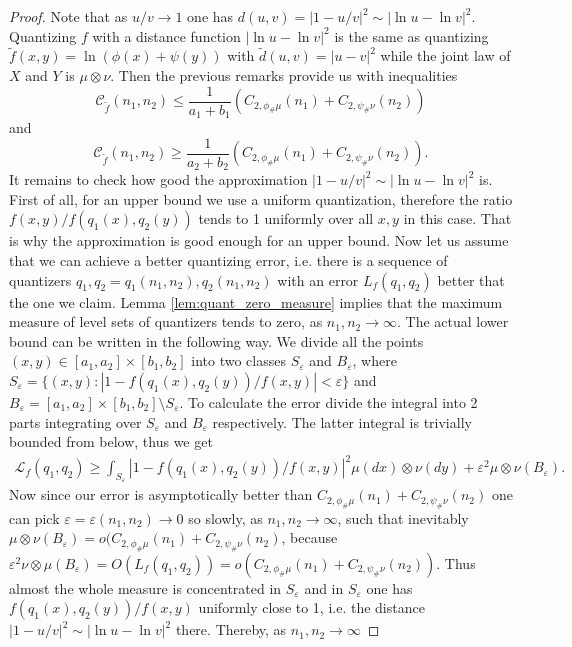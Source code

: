 \documentclass{amsart}
\theoremstyle{remark}
\numberwithin{equation}{section}
\numberwithin{figure}{section}
\def\eps{\varepsilon}
\begin{document}
\begin{proof}
	Note that as $u/v \to 1$ one has $d(u, v) = |1-u/v|^2 \sim |\ln u - \ln v|^2$. Quantizing $f$ with a distance function $|\ln u -\ln v|^2$ is the same as quantizing $\tilde f(x, y) = \ln(\phi(x) + \psi(y))$ with $\tilde d(u, v) = |u-v|^2$ while the joint law of $X$ and $Y$ is $\mu \otimes \nu$. Then the previous remarks provide us with inequalities
	\[
	\mathcal{C}_{\tilde f}(n_1, n_2) \leq \frac{1}{a_1 + b_1} (C_{2,\phi_\#\mu}(n_1) + C_{2,\psi_\#\nu}(n_2))
	\]
	and
	\[
	\mathcal{C}_{\tilde f}(n_1, n_2) \geq \frac{1}{a_2 + b_2} (C_{2,\phi_\#\mu}(n_1) + C_{2,\psi_\#\nu}(n_2)).
	\]
	It remains to check how good the approximation $|1 - u/v|^2 \sim |\ln u - \ln v|^2$ is. 
	First of all, for an upper bound we use a uniform quantization, therefore the ratio $f(x, y)/f(q_1(x), q_2(y))$ tends to 1 uniformly over all $x, y$ in this case. That is why the approximation is good enough for an upper bound.
	Now let us assume that we can achieve a better quantizing error, i.e. there is a sequence of quantizers $q_1, q_2 = q_1(n_1, n_2), q_2(n_1, n_2)$ with an error $L_f(q_1, q_2)$ better that the one we claim. Lemma \ref{lem:quant_zero_measure} implies that the maximum measure of level sets of quantizers tends to zero, as $n_1, n_2 \to \infty$. The actual lower bound can be written in the following way. We divide all the points $(x, y) \in [a_1, a_2]\times [b_1, b_2]$ into two classes $S_{\eps}$ and $B_{\eps}$, where $S_{\eps} = \{(x, y) : |1-f(q_1(x), q_2(y))/f(x, y)| < \eps\}$ and $B_\eps = [a_1, a_2]\times [b_1, b_2] \setminus S_\varepsilon$. To calculate the error divide the integral into 2 parts integrating over $S_\eps$ and $B_\eps$ respectively. The latter integral is trivially bounded from below, thus we get
	\begin{eqnarray*}
	\mathcal{L}_f(q_1, q_2) \geq 
	\int_{S_\eps} |1 - f(q_1(x), q_2(y))/f(x, y) |^2 \mu(dx) \otimes \nu (dy) + \eps^2 \mu\otimes\nu(B_\eps).
	\end{eqnarray*}
	Now since our error is asymptotically better than $C_{2,\phi_\#\mu}(n_1) + C_{2,\psi_\#\nu}(n_2)$ one can pick $\eps = \eps(n_1, n_2) \to 0$ so slowly, as $n_1, n_2 \to \infty$, such that inevitably $\mu \otimes \nu (B_\eps) = o(C_{2,\phi_\#\mu}(n_1) + C_{2,\psi_\#\nu}(n_2)$, because $\eps^2 \nu\otimes \mu(B_\eps) = O(L_f(q_1, q_2)) = o (C_{2,\phi_\#\mu}(n_1) + C_{2,\psi_\#\nu}(n_2))$. Thus almost the whole measure is concentrated in $S_\eps$ and in $S_\eps$ one has $f(q_1(x), q_2(y))/f(x, y)$ uniformly close to 1, i.e. the distance $|1-u/v|^2 \sim |\ln u - \ln v|^2$ there. Thereby, as $n_1, n_2 \to \infty$

\end{proof}
\end{document}

